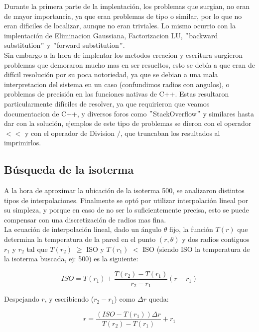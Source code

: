 \documentclass[12pt,a4paper]{article}
\begin{document}
Durante la primera parte de la implentación, los problemas que surgian, no eran de mayor importancia, ya que eran problemas de tipo o similar, por lo que no eran dificiles de localizar, aunque no eran triviales. Lo mismo ocurrio con la implentación  de Eliminacion Gaussiana, Factorizacion LU, $"$backward substitution$"$ y $"$forward substitution$"$. \\
Sin embargo a la hora de implentar los metodos creacion y escritura surgieron problemas que demoraron mucho mas en ser resueltos, esto se debía a que eran de difícil resolución por su poca notoriedad, ya que se debian a una mala interpretacion del sistema en un caso (confundimos radios con angulos), o problemas de precisión en las funciones nativas de C++. Estas resultaron particularmente difíciles de resolver, ya que requirieron que veamos documentacion de C++, y diversos foros como $"$StackOverflow$"$ y similares hasta dar con la solución, ejemplos de este tipo de problemas se dieron con el operador $<<$ y con el operador de Division $/$, que truncaban los resultados al imprimirlos. \\

\subsection{Búsqueda de la isoterma}

A la hora de aproximar la ubicación de la isoterma 500, se analizaron distintos tipos de interpolaciones. Finalmente se optó por utilizar interpolación lineal por su simpleza, y porque en caso de no ser lo suficientemente precisa, esto se puede compensar con una discretización de radios mas fina. \\

La ecuación de interpolación lineal, dado un ángulo $\theta$ fijo, la función $T(r)$ que determina la temperatura de la pared en el punto $(r,\theta)$ y dos radios contiguos $r_1$ y $r_2$ tal que $T(r_2)$ $\geq$ ISO y $T(r_1)$ $<$ ISO (siendo ISO la temperatura de la isoterma buscada, ej: 500) es la siguiente:

\begin{equation}
ISO = {T(r_1)} + \frac{T(r_2) - T(r_1)}{r_2 - r_1}(r - r_1)
\end{equation}

Despejando $r$, y escribiendo ($r_2 - r_1$) como $\Delta r$ queda:

\begin{equation}
r = \frac{(ISO - T(r_1)) \Delta r}{T(r_2) - T(r_1)} + r_1
\end{equation}
\end{document}

